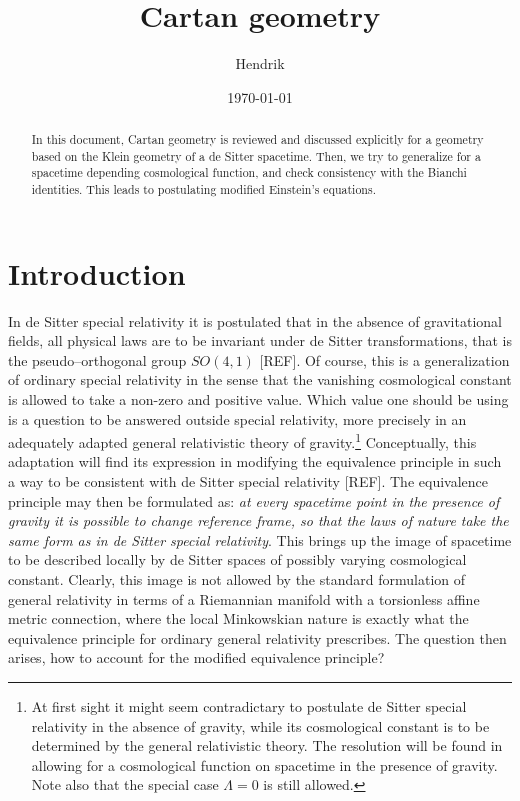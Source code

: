 \documentclass[11pt]{amsart}
\title{Cartan geometry}
\author{Hendrik}
\date{\today}
\begin{document}
\begin{abstract}
	In this document, Cartan geometry is reviewed and discussed 
	explicitly for a geometry based on the Klein geometry of a de 
	Sitter spacetime. Then, we try to generalize for a spacetime 
	depending cosmological function, and check consistency with 
	the Bianchi identities. This leads to postulating modified 
	Einstein's equations.
\end{abstract}

\maketitle

\section{Introduction}

In de Sitter special relativity it is postulated that in the 
absence of gravitational fields, all physical laws are to be 
invariant under de Sitter transformations, that is the 
pseudo--orthogonal group $SO(4,1)$ [{\blu REF}]. Of course, this 
is a generalization of ordinary special relativity in the sense 
that the vanishing cosmological constant is allowed to take a 
non-zero and positive value. Which value one should be using is a 
question to be answered outside special relativity, more 
precisely in an adequately adapted general relativistic theory of 
gravity.\footnote{At first sight it might seem contradictary to 
	postulate de Sitter special relativity in the absence of 
	gravity, while its cosmological constant is to be determined 
	by the general relativistic theory. {\blu The resolution will 
		be found in allowing for a cosmological function on 
		spacetime in the presence of gravity. Note also that the 
		special case $\Lambda = 0$ is still allowed.}}  
Conceptually, this adaptation will find its expression in 
modifying the equivalence principle in such a way to be 
consistent with de Sitter special relativity [{\blu REF}]. The 
equivalence principle may then be formulated as: \emph{at every	
	spacetime point in the presence of gravity it is possible to 
	change reference frame, so that the laws of nature take the 
	same form as in de Sitter special relativity}. This brings up 
the image of spacetime to be described locally by de Sitter 
spaces of possibly varying cosmological constant. Clearly, this 
image is not allowed by the standard formulation of general 
relativity in terms of a Riemannian manifold with a torsionless 
affine metric connection, where the local Minkowskian nature is 
exactly what the equivalence principle for ordinary general 
relativity prescribes. The question then arises, how to account 
for the modified equivalence principle?
\end{document}
